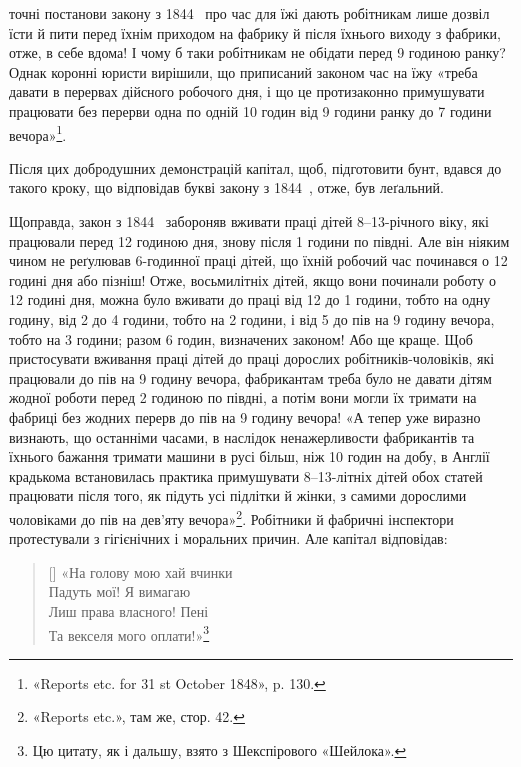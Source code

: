 \parcont{}  %
точні постанови закону з 1844~ про час для їжі дають робітникам
лише дозвіл їсти й пити перед їхнім приходом на фабрику
й після їхнього виходу з фабрики, отже, в себе вдома! І чому б
таки робітникам не обідати перед 9 годиною ранку? Однак коронні
юристи вирішили, що приписаний законом час на їжу «треба
давати в перервах дійсного робочого дня, і що це протизаконно
примушувати працювати без перерви одна по одній 10 годин
від 9 години ранку до 7 години вечора»\footnote{
«Reports etc. for 31 st October 1848», p. 130.
}.

Після цих добродушних демонстрацій капітал, щоб, підготовити
бунт, вдався до такого кроку, що відповідав букві закону
з 1844~, отже, був леґальний.

Щоправда, закон з 1844~ забороняв вживати праці дітей 8--13-річного
віку, які працювали перед 12 годиною дня, знову після
1 години по півдні. Але він ніяким чином не реґулював 6-годинної
праці дітей, що їхній робочий час починався о 12 годині
дня або пізніш! Отже, восьмилітніх дітей, якщо вони починали
роботу о 12 годині дня, можна було вживати до праці від 12 до
1 години, тобто на одну годину, від 2 до 4 години, тобто на 2 години,
і від 5 до пів на 9 годину вечора, тобто на 3 години; разом
6 годин, визначених законом! Або ще краще. Щоб пристосувати
вживання праці дітей до праці дорослих робітників-чоловіків, які
працювали до пів на 9 годину вечора, фабрикантам треба було не
давати дітям жодної роботи перед 2 годиною по півдні, а потім вони
могли їх тримати на фабриці без жодних перерв до пів на 9 годину
вечора! «А тепер уже виразно визнають, що останніми часами,
в наслідок ненажерливости фабрикантів та їхнього бажання тримати
машини в русі більш, ніж 10 годин на добу, в Англії крадькома
встановилась практика примушувати 8--13-літніх дітей
обох статей працювати після того, як підуть усі підлітки й жінки,
з самими дорослими чоловіками до пів на дев’яту вечора»\footnote{
«Reports etc.», там же, стор. 42.
}.
Робітники й фабричні інспектори протестували з гігієнічних і
моральних причин. Але капітал відповідав:

\settowidth{\versewidth}{«На голову мою хай вчинки}
\begin{verse}[\versewidth]
«На голову мою хай вчинки \\
Падуть мої! Я вимагаю \\
Лиш права власного! Пені \\
Та векселя мого оплати!»\footnote*{
Цю цитату, як і дальшу, взято з Шекспірового «Шейлока». 
}
\end{verse}

